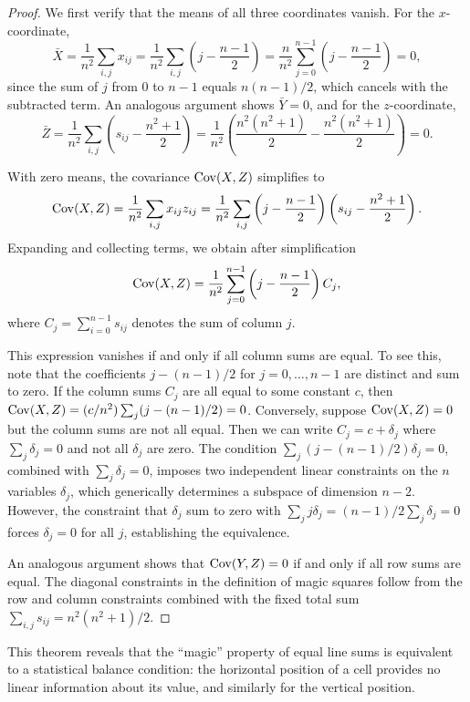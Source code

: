 \begin{proof}
We first verify that the means of all three coordinates vanish.
For the $x$-coordinate,
\[
\bar{X} = \frac{1}{n^2} \sum_{i,j} x_{ij} = \frac{1}{n^2} \sum_{i,j} \left( j - \frac{n-1}{2} \right) 
= \frac{n}{n^2} \sum_{j=0}^{n-1} \left( j - \frac{n-1}{2} \right) = 0,
\]
since the sum of $j$ from $0$ to $n-1$ equals $n(n-1)/2$, which cancels with the subtracted term.
An analogous argument shows $\bar{Y} = 0$, and for the $z$-coordinate,
\[
\bar{Z} = \frac{1}{n^2} \sum_{i,j} \left( s_{ij} - \frac{n^2+1}{2} \right) 
= \frac{1}{n^2} \left( \frac{n^2(n^2+1)}{2} - \frac{n^2(n^2+1)}{2} \right) = 0.
\]

With zero means, the covariance $\mathrm{Cov}(X, Z)$ simplifies to
\[
\mathrm{Cov}(X, Z) = \frac{1}{n^2} \sum_{i,j} x_{ij} z_{ij} 
= \frac{1}{n^2} \sum_{i,j} \left( j - \frac{n-1}{2} \right) \left( s_{ij} - \frac{n^2+1}{2} \right).
\]
Expanding and collecting terms, we obtain after simplification
\[
\mathrm{Cov}(X, Z) = \frac{1}{n^2} \sum_{j=0}^{n-1} \left( j - \frac{n-1}{2} \right) C_j,
\]
where $C_j = \sum_{i=0}^{n-1} s_{ij}$ denotes the sum of column $j$.

This expression vanishes if and only if all column sums are equal.
To see this, note that the coefficients $j - (n-1)/2$ for $j = 0, \ldots, n-1$ 
are distinct and sum to zero.
If the column sums $C_j$ are all equal to some constant $c$, 
then $\mathrm{Cov}(X, Z) = (c/n^2) \sum_j (j - (n-1)/2) = 0$.
Conversely, suppose $\mathrm{Cov}(X, Z) = 0$ but the column sums are not all equal.
Then we can write $C_j = c + \delta_j$ where $\sum_j \delta_j = 0$ and not all $\delta_j$ are zero.
The condition $\sum_j (j - (n-1)/2) \delta_j = 0$, combined with $\sum_j \delta_j = 0$,
imposes two independent linear constraints on the $n$ variables $\delta_j$,
which generically determines a subspace of dimension $n-2$.
However, the constraint that $\delta_j$ sum to zero with $\sum_j j \delta_j = (n-1)/2 \sum_j \delta_j = 0$
forces $\delta_j = 0$ for all $j$, establishing the equivalence.

An analogous argument shows that $\mathrm{Cov}(Y, Z) = 0$ if and only if all row sums are equal.
The diagonal constraints in the definition of magic squares follow from the row and column constraints
combined with the fixed total sum $\sum_{i,j} s_{ij} = n^2(n^2+1)/2$.
\end{proof}

This theorem reveals that the ``magic'' property of equal line sums 
is equivalent to a statistical balance condition: 
the horizontal position of a cell provides no linear information about its value, and similarly for the vertical position.

